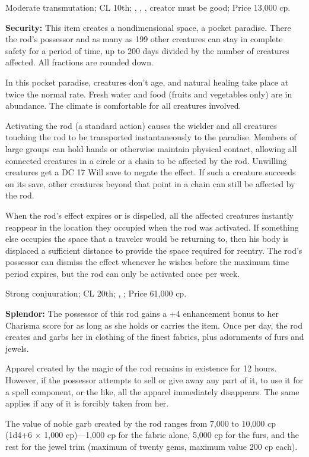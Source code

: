 Moderate transmutation; CL 10th; , , , creator must be good; Price 13,000 cp.

\textbf{Security:} This item creates a nondimensional space, a pocket paradise. There the rod's possessor and as many as 199 other creatures can stay in complete safety for a period of time, up to 200 days divided by the number of creatures affected. All fractions are rounded down.

In this pocket paradise, creatures don't age, and natural healing take place at twice the normal rate. Fresh water and food (fruits and vegetables only) are in abundance. The climate is comfortable for all creatures involved.

Activating the rod (a standard action) causes the wielder and all creatures touching the rod to be transported instantaneously to the paradise. Members of large groups can hold hands or otherwise maintain physical contact, allowing all connected creatures in a circle or a chain to be affected by the rod. Unwilling creatures get a DC 17 Will save to negate the effect. If such a creature succeeds on its save, other creatures beyond that point in a chain can still be affected by the rod.

When the rod's effect expires or is dispelled, all the affected creatures instantly reappear in the location they occupied when the rod was activated. If something else occupies the space that a traveler would be returning to, then his body is displaced a sufficient distance to provide the space required for reentry. The rod's possessor can dismiss the effect whenever he wishes before the maximum time period expires, but the rod can only be activated once per week.

Strong conjuuration; CL 20th; , ; Price 61,000 cp.

\textbf{Splendor:} The possessor of this rod gains a +4 enhancement bonus to her Charisma score for as long as she holds or carries the item. Once per day, the rod creates and garbs her in clothing of the finest fabrics, plus adornments of furs and jewels.

Apparel created by the magic of the rod remains in existence for 12 hours. However, if the possessor attempts to sell or give away any part of it, to use it for a spell component, or the like, all the apparel immediately disappears. The same applies if any of it is forcibly taken from her.

The value of noble garb created by the rod ranges from 7,000 to 10,000 cp (1d4+6 $\times$ 1,000 cp)---1,000 cp for the fabric alone, 5,000 cp for the furs, and the rest for the jewel trim (maximum of twenty gems, maximum value 200 cp each).

